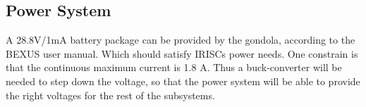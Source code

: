 \pagebreak
\subsection{Power System}
A 28.8V/1mA battery package can be provided by the gondola, according to the BEXUS user manual. Which should satisfy IRISCs power needs. One constrain is that the continuous maximum current is 1.8 A. Thus a buck-converter will be needed to step down the voltage, so that the power system will be able to provide the right voltages for the rest of the subsystems.  

 



\raggedbottom
